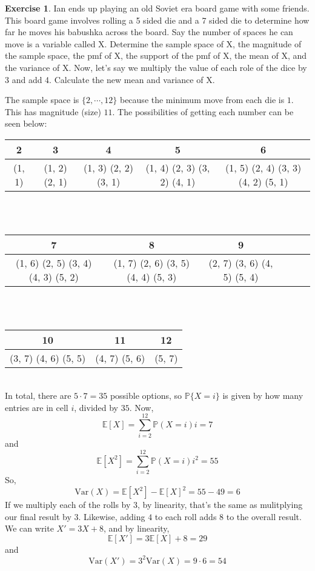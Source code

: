 \documentclass[12pt]{amsart}
\theoremstyle{definition}
\newtheorem{exercise}{Exercise}
\numberwithin{equation}{section}
\theoremstyle{plain}
\newcommand{\E}{\mathbb{E}}
\newcommand{\Var}{\text{Var}}
\renewcommand{\P}{\mathbb{P}}
\begin{document}
\begin{exercise}
Ian ends up playing an old Soviet era board game with some friends. This board game involves rolling a 5 sided die and a 7 sided die to determine how far he moves his babushka across the board. Say the number of spaces he can move is a variable called X. Determine the sample space of X, the magnitude of the sample space, the pmf of X, the support of the pmf of X, the mean of X, and the variance of X.
\newline
Now, let's say we multiply the value of each role of the dice by 3 and add 4. Calculate the new mean and variance of X.
\begin{answer}
    The sample space is $\{2,\cdots, 12\}$ because the minimum move from each die is $1$. This has magnitude (size) $11$. The possibilities of getting each number can be seen below: \\
    \begin{tabular}{|c|c|c|c|c|}
        \hline 2 & 3 & 4 & 5 & 6  \\ \hline
        (1, 1)  & (1, 2) (2, 1)  & (1, 3) (2, 2) (3, 1)  & (1, 4) (2, 3) (3, 2) (4, 1)  & (1, 5) (2, 4) (3, 3) (4, 2) (5, 1) \\ \hline
    \end{tabular} \\ \\
    \begin{tabular}{|c|c|c|c|c|c|}
        \hline 7 & 8 & 9 \\ \hline
         (1, 6) (2, 5) (3, 4) (4, 3) (5, 2)  & (1, 7) (2, 6) (3, 5) (4, 4) (5, 3)  & (2, 7) (3, 6) (4, 5) (5, 4) \\ \hline
    \end{tabular} \\ \\
    \begin{tabular}{|c|c|c|}
        \hline 10 & 11 & 12 \\ \hline
         (3, 7) (4, 6) (5, 5)  & (4, 7) (5, 6)  & (5, 7)  \\ \hline
    \end{tabular} \\
    In total, there are $5 \cdot 7 = 35$ possible options, so $\P\{X = i\}$ is given by how many entries are in cell $i$, divided by $35$. Now,
    \[
        \E[X] = \sum_{i=2}^{12} \P(X = i) i = 7
    \]
    and
    \[
        \E[X^2] = \sum_{i=2}^{12} \P(X = i) i^2 = 55
    \]
    So,
    \[
        \Var (X) = \E[X^2] - \E[X]^2 = 55 - 49 = 6
    \]
    If we multiply each of the rolls by $3$, by linearity, that's the same as mulitplying our final result by $3$. Likewise, adding $4$ to each roll adds $8$ to the overall result. We can write $X' = 3X + 8$, and by linearity,
    \[
        \E[X'] = 3\E [X] + 8 = 29
    \]
    and
    \[
        \Var(X') = 3^2 \Var (X) = 9\cdot 6 = 54
    \]
\end{answer}
\end{exercise}

 
\end{document}
